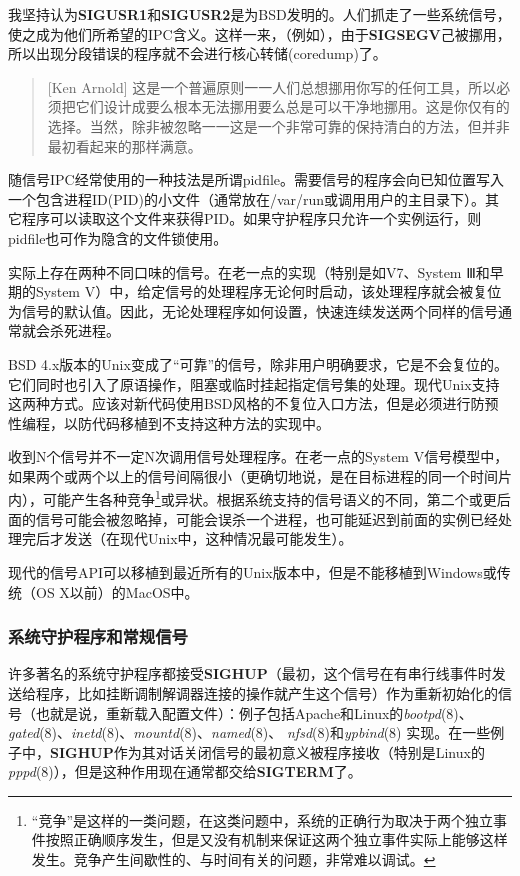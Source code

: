 \documentclass[12pt,oneside]{book}
\begin{document}
\begin{common-format}
我坚持认为\textbf{SIGUSR1}和\textbf{SIGUSR2}是为BSD发明的。人们抓走了一些系统信号，使之成为他们所希望的IPC含义。这样一来，（例如），由于\textbf{SIGSEGV}己被挪用，所以出现分段错误的程序就不会进行核心转储(coredump)了。

\begin{quote}[Ken Arnold]
这是一个普遍原则一一人们总想挪用你写的任何工具，所以必须把它们设计成要么根本无法挪用要么总是可以干净地挪用。这是你仅有的选择。当然，除非被忽略一一这是一个非常可靠的保持清白的方法，但并非最初看起来的那样满意。
\end{quote}

随信号IPC经常使用的一种技法是所谓pidfile。需要信号的程序会向已知位置写入一个包含进程ID(PID)的小文件（通常放在/var/run或调用用户的主目录下）。其它程序可以读取这个文件来获得PID。如果守护程序只允许一个实例运行，则pidfile也可作为隐含的文件锁使用。

实际上存在两种不同口味的信号。在老一点的实现（特别是如V7、System Ⅲ和早期的System V）中，给定信号的处理程序无论何时启动，该处理程序就会被复位为信号的默认值。因此，无论处理程序如何设置，快速连续发送两个同样的信号通常就会杀死进程。

BSD 4.x版本的Unix变成了“可靠”的信号，除非用户明确要求，它是不会复位的。它们同时也引入了原语操作，阻塞或临时挂起指定信号集的处理。现代Unix支持这两种方式。应该对新代码使用BSD风格的不复位入口方法，但是必须进行防预性编程，以防代码移植到不支持这种方法的实现中。

收到N个信号并不一定N次调用信号处理程序。在老一点的System V信号模型中，如果两个或两个以上的信号间隔很小（更确切地说，是在目标进程的同一个时间片内），可能产生各种竞争\footnote{“竞争”是这样的一类问题，在这类问题中，系统的正确行为取决于两个独立事件按照正确顺序发生，但是又没有机制来保证这两个独立事件实际上能够这样发生。竞争产生间歇性的、与时间有关的问题，非常难以调试。}或异状。根据系统支持的信号语义的不同，第二个或更后面的信号可能会被忽略掉，可能会误杀一个进程，也可能延迟到前面的实例已经处理完后才发送（在现代Unix中，这种情况最可能发生）。

现代的信号API可以移植到最近所有的Unix版本中，但是不能移植到Windows或传统（OS X以前）的MacOS中。


\subsubsection{系统守护程序和常规信号}
许多著名的系统守护程序都接受\textbf{SIGHUP}（最初，这个信号在有串行线事件时发送给程序，比如挂断调制解调器连接的操作就产生这个信号）作为重新初始化的信号（也就是说，重新载入配置文件）：例子包括Apache和Linux的\textit{bootpd}(8)、\textit{gated}(8)、\textit{inetd}(8)、\textit{mountd}(8)、\textit{named}(8)、 \textit{nfsd}(8)和\textit{ypbind}(8) 实现。在一些例子中，\textbf{SIGHUP}作为其对话关闭信号的最初意义被程序接收（特别是Linux的\textit{pppd}(8)），但是这种作用现在通常都交给\textbf{SIGTERM}了。


\end{common-format}
\end{document}

